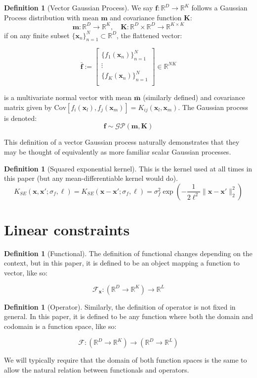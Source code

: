 \documentclass[12pt,a4paper,twoside]{report}
\theoremstyle{definition}
\newtheorem{definition}[thm]{Definition}
\begin{document}
\begin{definition}[Vector Gaussian Process]\label{vectorGP}
	We say $\mathbf f:\mathbb{R}^D\to\mathbb{R}^K$ follows a Gaussian Process distribution with mean $\mathbf m$ and covariance function $\mathbf K$:
	$$\mathbf m:\mathbb{R}^D\to\mathbb{R}^K, \quad \mathbf K:\mathbb{R}^D\times \mathbb{R}^D\to\mathbb{R}^{K\times K}$$
	if on any finite subset $\{\mathbf x_n\}_{n=1}^N \subset\mathbb{R}^D$, the flattened vector:

	$$ \mathbf {\bar f}:= \begin{bmatrix}
	\{f_1(\mathbf x_n)\}_{n=1}^N \\ 
	\vdots \\ 
	\{f_K(\mathbf x_n)\}_{n=1}^N\\
\end{bmatrix}\in \mathbb{R}^{NK}$$	

is a multivariate normal vector with mean $\mathbf {\bar m}$ (similarly defined) and covariance matrix given by $\text{Cov}[f_i(\mathbf x_l),f_j(\mathbf x_m)]= K_{ij}(\mathbf x_l,\mathbf x_m)$. 
The Gaussian process is denoted:
$$\mathbf f\sim \mathcal{GP}(\mathbf m, \mathbf  K)$$
\end{definition}

This definition of a vector Gaussian process naturally demonstrates that they may be thought of equivalently as more familiar scalar Gaussian processes.

\begin{definition}[Squared exponential kernel]\label{SE}
	This is the kernel used at all times in this paper (but any mean-differentiable kernel would do). 
$$K_{SE}(\mathbf x,\mathbf x'; \sigma_f, \ell) = K_{SE}(\mathbf x - \mathbf x';\sigma_f, \ell) = \sigma^2_f \exp\left(-\frac{1}{2\ell^2}\|\mathbf x-\mathbf x'\|_2^2\right)$$
\end{definition}

\section{Linear constraints}
\begin{definition}[Functional]
	The definition of functional changes depending on the context, but in this paper, it is defined to be an object mapping a function to vector, like so:

$$\mathscr F_\mathbf x: (\mathbb{R}^D\to\mathbb{R}^K)\to\mathbb{R}^L$$
\end{definition}

\begin{definition}[Operator]
	Similarly, the definition of operator is not fixed in general. In this paper, it is defined to be any function where both the domain and codomain is a function space, like so:

$$\mathscr F: (\mathbb{R}^D\to\mathbb{R}^K)\to(\mathbb{R}^D\to\mathbb{R}^L)$$

We will typically require that the domain of both function spaces is the same to allow the natural relation between functionals and operators.
\end{definition}
\end{document}
